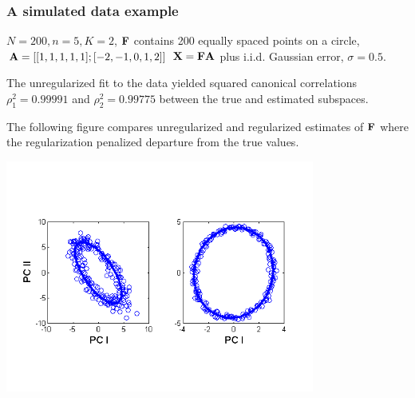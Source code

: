 \documentclass[11pt]{beamer}
\begin{document}

\begin{frame}

\frametitle{A simulated data example}

\bi
  \item $N = 200, n = 5, K = 2$, $\mbox{\bf F}$ contains 200 equally spaced points on a circle, $\mbox{\bf A} = [[1,1,1,1,1];[-2,-1,0,1,2]]$  $\mbox{\bf X} = \mbox{\bf F} \mbox{\bf A}$ plus i.i.d. Gaussian error, $\sigma = 0.5.$
  \item The unregularized fit to the data yielded squared canonical correlations $\rho_1^2 = 0.99991$ and $\rho_2^2 = 0.99775$ between the true and estimated subspaces.
  \item The following figure compares unregularized and regularized estimates of $\mbox{\bf F}$ where the regularization
  penalized departure from the true values.
\ei

\end{frame}


\begin{frame}

\begin{center}
\includegraphics[width=4in]{figs/MDA1.png}
\end{center}

\end{frame}

\end{document}
